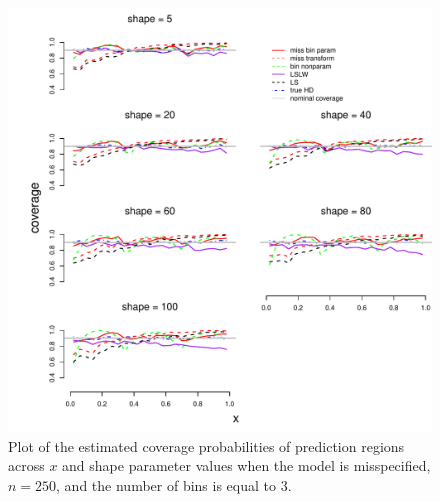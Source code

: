 \documentclass[11pt]{article}\usepackage[]{graphicx}\usepackage[]{color}
\makeatletter
\def\maxwidth{ %
  \ifdim\Gin@nat@width>\linewidth
    \linewidth
  \else
    \Gin@nat@width
  \fi
}
\newenvironment{knitrout}{}{} %
\makeatother
\begin{document}
\newpage
\begin{figure}[h!]
\begin{center}
\begin{knitrout}
\color{fgcolor}
\includegraphics[width=\maxwidth]{figure/Fig-misspec-inx-250-1} 

\end{knitrout}
\end{center}
\caption{Plot of the estimated coverage probabilities of prediction regions 
  across $x$ and shape parameter values when the model is misspecified, 
  $n = 250$, and the number of bins is equal to $3$.}
\label{Fig:misspec.inx.250}
\end{figure}
\end{document}
